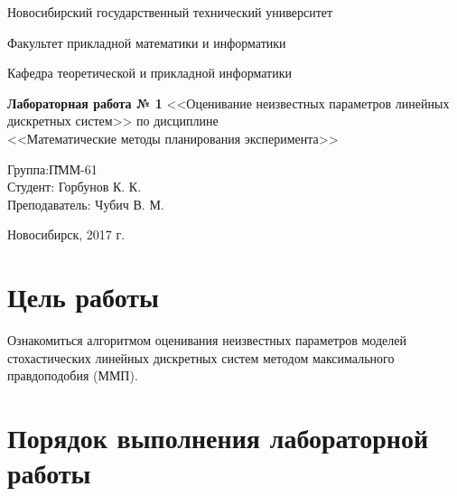 \documentclass[a4paper,14pt]{extarticle}
\begin{document}
\setcounter{secnumdepth}{0}

\begin{titlepage}

  \begin{center}
    Новосибирский государственный технический университет
    
    Факультет прикладной математики и информатики
    
    Кафедра теоретической и прикладной информатики
    
    \vspace{250pt}
    
    \textbf{\Large{Лабораторная работа № 1}}
    \medbreak
    <<Оценивание неизвестных параметров линейных дискретных систем>>
    \medbreak
    по дисциплине \\
    \medbreak
    <<Математические методы планирования эксперимента>>
    \vspace{100pt}
  \end{center}

  \begin{flushleft}
    \begin{tabbing}
      Группа:\qquad\qquad \= ПММ-61\\
      Студент:            \> Горбунов К. К.\\
      Преподаватель:      \> Чубич В. М.\\
    \end{tabbing}
  \end{flushleft}

  \begin{center}
    \vspace{\fill}
    Новосибирск, 2017 г.
  \end{center}

\end{titlepage}

\newpage

\section{Цель работы}

Ознакомиться алгоритмом оценивания неизвестных параметров моделей
стохастических линейных дискретных систем методом максимального правдоподобия
(ММП).

\section{Порядок выполнения лабораторной работы}
\end{document}
